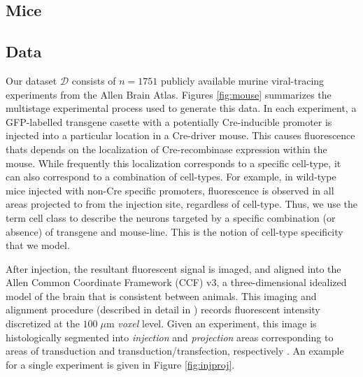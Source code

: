 \newpage
\subsection{Mice}


\subsection{Data}

Our dataset $\mathcal D$ consists of $n=1751$ publicly available murine viral-tracing experiments from the Allen Brain Atlas.
Figures \ref{fig:mouse} summarizes the multistage experimental process used to generate this data.
In each experiment, a GFP-labelled transgene casette with a potentially Cre-inducible promoter is injected into a particular location in a Cre-driver mouse.
This causes fluorescence thats depends on the localization of Cre-recombinase expression within the mouse.
While frequently this localization corresponds to a specific cell-type, it can also correspond to a combination of cell-types.
For example, in wild-type mice injected with non-Cre specific promoters, fluorescence is observed in all areas projected to from the injection site, regardless of cell-type.
Thus, we use the term cell class to describe the neurons targeted by a specific combination (or absence) of transgene and mouse-line.
This is the notion of cell-type specificity that we model.

After injection, the resultant fluorescent signal is imaged, and aligned into the Allen Common Coordinate Framework (CCF) v3, a three-dimensional idealized model of the brain that is consistent between animals.
This imaging and alignment procedure (described in detail in \citep{Harris2019-mr}) records fluorescent intensity discretized at the $100 \; \mu$m \textit{voxel} level. 
Given an experiment, this image is histologically segmented into \textit{injection} and \textit{projection} areas corresponding to areas of transduction and transduction/transfection, respectively .
An example for a single experiment is given in Figure \ref{fig:injproj}.

